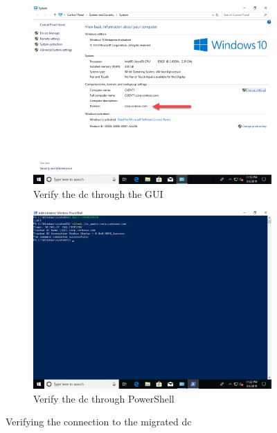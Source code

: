 \begin{figure}[h]\ContinuedFloat
	\begin{subfigure}{0.5\textwidth}
		\captionsetup{width=0.8\linewidth}
		\includegraphics[width=0.9\linewidth]{img/Methodologie/Verification2.png}
		\centering
		\caption{Verify the \acrshort{dc} through the GUI}
	\end{subfigure}
	\begin{subfigure}{0.5\textwidth}
		\captionsetup{width=0.8\linewidth}
		\includegraphics[width=0.9\linewidth]{img/Methodologie/Verification3.png} 
		\centering
		\caption{Verify the \acrshort{dc} through PowerShell}
	\end{subfigure}
	\caption[In-place migration verification]{Verifying the connection to the migrated \acrshort{dc}}
	\label{fig:Verification}
\end{figure}
\clearpage

